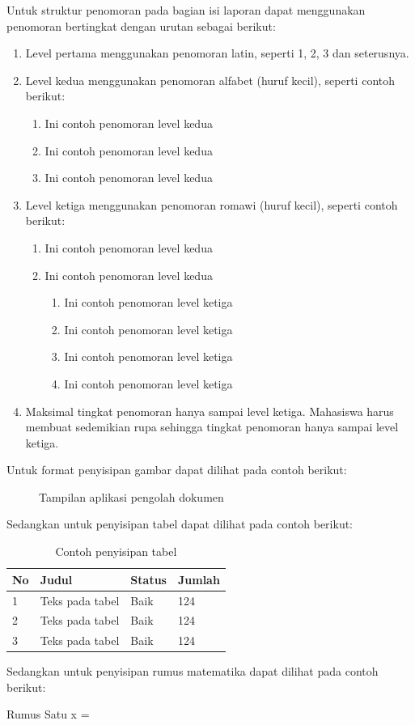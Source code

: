 Untuk struktur penomoran pada bagian isi laporan dapat menggunakan penomoran bertingkat dengan urutan sebagai berikut:
\begin{enumerate}
  \item Level pertama menggunakan penomoran latin, seperti 1, 2, 3 dan seterusnya.
  \item Level kedua menggunakan penomoran alfabet (huruf kecil), seperti contoh berikut:
  \begin{enumerate}
    \item Ini contoh penomoran level kedua
    \item Ini contoh penomoran level kedua
    \item Ini contoh penomoran level kedua
  \end{enumerate}
  \item Level ketiga menggunakan penomoran romawi (huruf kecil), seperti contoh berikut:
  \begin{enumerate}
    \item Ini contoh penomoran level kedua
    \item Ini contoh penomoran level kedua
    \begin{enumerate}
      \item Ini contoh penomoran level ketiga
      \item Ini contoh penomoran level ketiga
      \item Ini contoh penomoran level ketiga
      \item Ini contoh penomoran level ketiga
    \end{enumerate}
  \end{enumerate}
  \item Maksimal tingkat penomoran hanya sampai level ketiga. Mahasiswa harus membuat sedemikian rupa sehingga tingkat penomoran hanya sampai level ketiga.
\end{enumerate}

Untuk format penyisipan gambar dapat dilihat pada contoh berikut:

\begin{figure}[H]
\centering
{}
\caption{Tampilan aplikasi pengolah dokumen}
\label{fig:contohgambar}
\end{figure}

Sedangkan untuk penyisipan tabel dapat dilihat pada contoh berikut:

\begin{table}[H]
\caption{Contoh penyisipan tabel}
\label{tab:contohtabel}
\begin{tabularx}{\textwidth}{|p{10mm}|X|p{25mm}|p{25mm}|}
\hline
No & Judul           & Status & Jumlah\\ \hline
1  & Teks pada tabel & Baik   & 124\\ \hline
2  & Teks pada tabel & Baik   & 124\\ \hline
3  & Teks pada tabel & Baik   & 124\\ \hline
\end{tabularx}
\end{table}

Sedangkan untuk penyisipan rumus matematika dapat dilihat pada contoh berikut:
\begin{rumus}{Rumus Satu}
  x = 
  \label{eq:abc}
\end{rumus}
